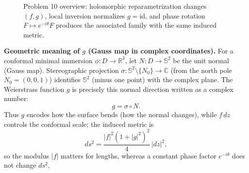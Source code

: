\documentclass[12pt,a4paper]{article}
\theoremstyle{plain}
\theoremstyle{definition}      %
\begin{document}
\begin{figure}[H]
{%
	}
	\caption{Problem 10 overview: holomorphic reparametrization changes $(f,g)$, local inversion normalizes $g=\mathrm{id}$, and phase rotation $F\mapsto e^{-i\theta}F$ produces the associated family with the same induced metric.}
\end{figure}


	
	\medskip
	\noindent
	\textbf{Geometric meaning of $g$ (Gauss map in complex coordinates).}
	For a conformal minimal immersion $\phi:D\to\mathbb R^3$, let $N:D\to\mathbb S^2$ be the unit normal (Gauss map).
	Stereographic projection $\sigma:\mathbb S^2\setminus\{N_0\}\to\mathbb C$ (from the north pole $N_0=(0,0,1)$) identifies
	$\mathbb S^2$ (minus one point) with the complex plane. The Weierstrass function $g$ is precisely this normal direction
	written as a complex number:
	\[
	g=\sigma\circ N.
	\]
	Thus $g$ encodes how the surface bends (how the normal changes), while $f\,dz$ controls the conformal scale; the induced
	metric is
	\[
	ds^2=\frac{|f|^2(1+|g|^2)^2}{4}\,|dz|^2,
	\]
	so the modulus $|f|$ matters for lengths, whereas a constant phase factor $e^{-i\theta}$ does not change $ds^2$.
	\medskip
	
\end{document}
